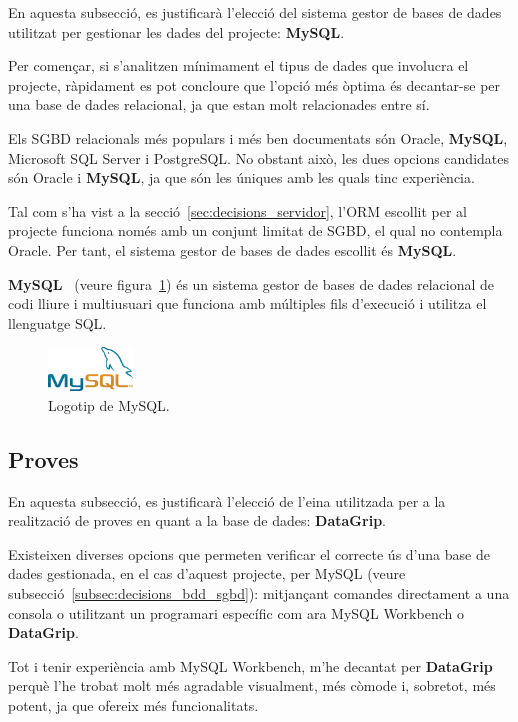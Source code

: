 \documentclass[a4paper,12pt]{ThesisStyle}
\begin{document}
En aquesta subsecció, es justificarà l'elecció del sistema gestor de bases de dades utilitzat per gestionar les dades del projecte: \textbf{MySQL}.

Per començar, si s'analitzen mínimament el tipus de dades que involucra el projecte, ràpidament es pot concloure que l'opció més òptima és decantar-se per una base de dades relacional, ja que estan molt relacionades entre sí.

Els SGBD relacionals més populars i més ben documentats són Oracle, \textbf{MySQL}, Microsoft SQL Server i PostgreSQL. No obstant això, les dues opcions candidates són Oracle i \textbf{MySQL}, ja que són les úniques amb les quals tinc experiència.

Tal com s'ha vist a la secció~\ref{sec:decisions_servidor}, l'ORM escollit per al projecte funciona només amb un conjunt limitat de SGBD, el qual no contempla Oracle. Per tant, el sistema gestor de bases de dades escollit és \textbf{MySQL}.

\textbf{MySQL}~\cite{MySQL} (veure figura~\ref{img:logo_mysql}) és un sistema gestor de bases de dades relacional de codi lliure i multiusuari que funciona amb múltiples fils d'execució i utilitza el llenguatge SQL.

\begin{figure}[H]
  \centering
  \includegraphics[width=0.2\textwidth]{assets/logos/MySQL.png}
  \caption{\label{img:logo_mysql}Logotip de MySQL.}
\end{figure}

\subsection{Proves}
\label{subsec:decisions_bdd_proves}

En aquesta subsecció, es justificarà l'elecció de l'eina utilitzada per a la realització de proves en quant a la base de dades: \textbf{DataGrip}.

Existeixen diverses opcions que permeten verificar el correcte ús d'una base de dades gestionada, en el cas d'aquest projecte, per MySQL (veure subsecció~\ref{subsec:decisions_bdd_sgbd}): mitjançant comandes directament a una consola o utilitzant un programari específic com ara MySQL Workbench o \textbf{DataGrip}.

Tot i tenir experiència amb MySQL Workbench, m'he decantat per \textbf{DataGrip} perquè l'he trobat molt més agradable visualment, més còmode i, sobretot, més potent, ja que ofereix més funcionalitats.
\end{document}
